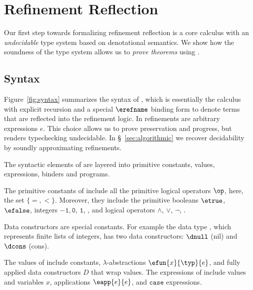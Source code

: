 \section{Refinement Reflection}
\label{sec:formalism}
\label{sec:types-reflection}

Our first step towards formalizing refinement
reflection is a core calculus \corelan with an
\emph{undecidable} type system based on
denotational semantics.
We show how the soundness of the type system
allows us to \emph{prove theorems} using \corelan.

%

\subsection{Syntax}

%
Figure~\ref{fig:syntax} summarizes the syntax of \corelan,
which is essentially the calculus \undeclang~\cite{Vazou14}
with explicit recursion and a special $\erefname$ binding form
to denote terms that are reflected into the refinement logic.
%
In \corelan refinements are arbitrary expressions $e$.
%
This choice allows us to prove preservation and progress,
but renders typechecking undecidable.
%
In \S~\ref{sec:algorithmic} we recover
decidability by soundly approximating refinements.

The syntactic elements of \corelan are layered into
primitive constants, values, expressions, binders
and programs.

The primitive constants of \corelan
include all the primitive logical
operators $\op$, here, the set $\{ =, <\}$.
%
Moreover, they include the
primitive booleans $\etrue$, $\efalse$,
integers $\mathtt{-1}, \mathtt{0}$, $\mathtt{1}$, \etc,
and logical operators $\mathtt{\land}$, $\mathtt{\lor}$, $\mathtt{\lnot}$, \etc.

%
Data constructors are special constants.
For example the data type \tintlist, which represents
finite lists of integers, has two data constructors: $\dnull$ (nil)
and $\dcons$ (cons).

%
The values of \corelan include
constants, $\lambda$-abstractions
$\efun{x}{\typ}{e}$, and fully
applied data constructors $D$
that wrap values.
%
The expressions of \corelan
include values and variables $x$,
applications $\eapp{e}{e}$, and
$\mathtt{case}$ expressions.

